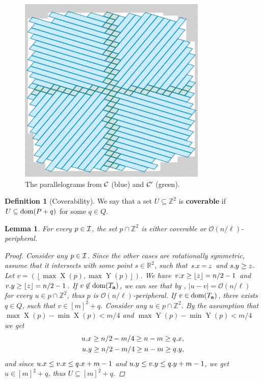 \documentclass[11pt, letterpaper]{article}
\theoremstyle{plain}
\newtheorem{lemma}{Lemma}
\theoremstyle{definition}
\newtheorem{definition}{Definition}
\theoremstyle{remark}
\newcommand{\R}{\mathbb{R}}
\newcommand{\Z}{\mathbb{Z}}
\renewcommand{\O}{\mathcal{O}}
\newcommand{\floor}[1]{\left\lfloor #1 \right\rfloor}
\newcommand{\eq}[1]{\begin{align*} #1 \end{align*}}
\DeclareMathOperator*{\X}{X}
\DeclareMathOperator*{\Y}{Y}
\begin{document}
\begin{figure}[!t]
	\begin{center}
		\includegraphics[width=0.8\textwidth]{drawings/text_decomposition}
	\end{center}
	\caption{The parallelograms from $\mathcal{C}$ (blue) and $\mathcal{C}'$ (green).}
	\label{figure:text_decomposition}
\end{figure}

\begin{definition}[Coverability]
	We say that a set $U \subseteq \Z^2$ is \textbf{coverable} if $U \subseteq \operatorname*{dom}(P + q)$ for some $q \in Q$.
\end{definition}

\begin{lemma}\label{I_division}
	For every $p \in \mathcal{I}$, the set $p \cap \Z^2$ is either coverable or $\O(n / \ell)$-peripheral.
	\begin{proof}
		Consider any $p \in \mathcal{I}$.
		Since the other cases are rotationally symmetric, assume that it intersects with some point $s \in \R^2$, such that $s.x = z$ and $s.y \ge z$.
		Let $v = (\floor{\max \X(p), \max \Y(p)})$.
		We have $\x{v} \ge \floor{z} = n / 2 - 1$ and $\y{v} \ge \floor{z} = n / 2 - 1$.
		If $v \not \in \operatorname*{dom}(T_\mathbf{a})$, we can see that by ,
		$|u - v| = \O(n / \ell)$ for every $u \in p \cap \Z^2$, thus $p$ is $\O(n / \ell)$-peripheral.
		If $v \in \operatorname*{dom}(T_\mathbf{a})$, there exists $q \in Q$, such that $v \in [m]^2 + q$.
		Consider any $u \in p \cap \Z^2$.
		By the assumption that $\max \X(p) - \min \X(p) < m / 4$ and $\max \Y(p) - \min \Y(p) < m / 4$ we get
		\eq{
			\x{u} \ge n / 2 - m / 4 \ge n - m \ge \x{q},\\ 
			\y{u} \ge n / 2 - m / 4 \ge n - m \ge \y{q},
		}
		and since $u.x \le v.x \le q.x + m - 1$ and $u.y \le v.y \le q.y + m - 1$, we get $u \in [m]^2 + q$, thus $U \subseteq [m]^2 + q$.
	\end{proof}
\end{lemma}
\end{document}
